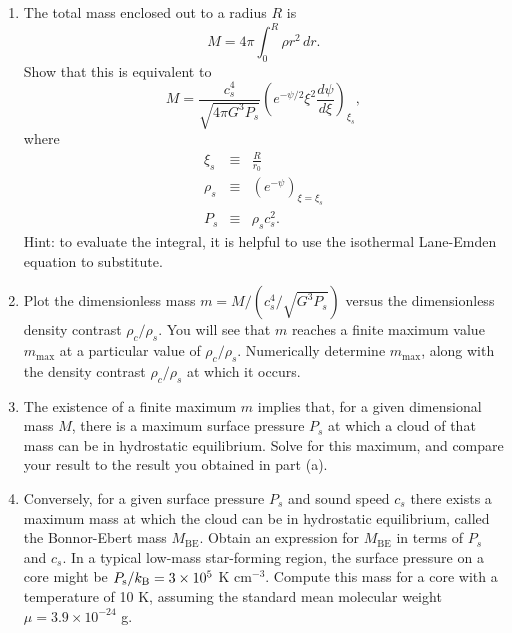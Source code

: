\begin{enumerate}
\begin{enumerate}
\item The total mass enclosed out to a radius $R$ is
\begin{displaymath}
M = 4\pi \int_0^R \rho r^2 \, dr.
\end{displaymath}
Show that this is equivalent to
\begin{displaymath}
M =\frac{c_s^4}{\sqrt{4\pi G^3 P_s}} \left(e^{-\psi/2}\xi^2 \frac{d\psi}{d\xi}\right)_{\xi_s},
\end{displaymath}
where
\begin{eqnarray*}
\xi_s & \equiv & \frac{R}{r_0} \\
\rho_s & \equiv & \left(e^{-\psi}\right)_{\xi = \xi_s} \\
P_s & \equiv & \rho_s c_s^2.
\end{eqnarray*}
Hint: to evaluate the integral, it is helpful to use the isothermal Lane-Emden equation to substitute.
\item Plot the dimensionless mass $m = M/(c_s^4/\sqrt{G^3 P_s})$ versus the dimensionless density contrast $\rho_c/\rho_s$. You will see that $m$ reaches a finite maximum value $m_{\mathrm{max}}$ at a particular value of $\rho_c/\rho_s$. Numerically determine $m_{\mathrm{max}}$, along with the density contrast $\rho_c/\rho_s$ at which it occurs.
\item The existence of a finite maximum $m$ implies that, for a given dimensional mass $M$, there is a maximum surface pressure $P_s$ at which a cloud of that mass can be in hydrostatic equilibrium. Solve for this maximum, and compare your result to the result you obtained in part (a).
\item Conversely, for a given surface pressure $P_s$ and sound speed $c_s$ there exists a maximum mass at which the cloud can be in hydrostatic equilibrium, called the Bonnor-Ebert mass $M_{\mathrm{BE}}$. Obtain an expression for $M_{\mathrm{BE}}$ in terms of $P_s$ and $c_s$. In a typical low-mass star-forming region, the surface pressure on a core might be $P_{\mathrm{s}}/k_{\rm B} = 3\times 10^5$ K cm$^{-3}$. Compute this mass for a core with a temperature of 10 K, assuming the standard mean molecular weight $\mu=3.9\times 10^{-24}$ g.\\
\end{enumerate}


\end{enumerate}
